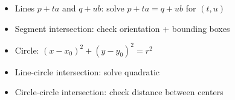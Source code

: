 \begin{itemize}
  \item Lines $p+ta$ and $q+ub$: solve $p+ta=q+ub$ for $(t,u)$
  \item Segment intersection: check orientation + bounding boxes
  \item Circle: $(x-x_0)^2+(y-y_0)^2=r^2$
  \item Line-circle intersection: solve quadratic
  \item Circle-circle intersection: check distance between centers
\end{itemize}
